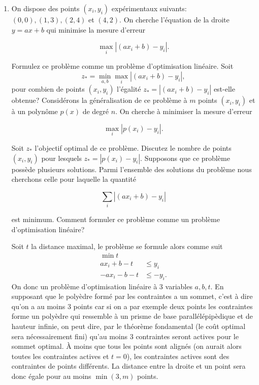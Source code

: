 \begin{enumerate}
  \item On dispose des points $(x_i, y_i)$ expérimentaux suivants: $(0, 0), (1, 3), (2, 4)$ et $(4, 2)$. On cherche l'équation de la
    droite $y=ax+b$ qui minimise la mesure d'erreur

    $$\max_i | (ax_i+b)-y_i |.$$

    Formulez ce problème comme un problème d'optimisation linéaire. Soit
    $$z_* = \min_{a, b} \max_i|(ax_i+b)-y_i|,$$ pour combien de points
    $(x_i, y_i)$ l'égalité
    $z_*= | (ax_i+b)-y_i |$ est-elle obtenue? Considérons la généralisation de ce problème à $m$ points $(x_i, y_i)$ et à un polynôme $p(x)$ de degré $n$. On
    cherche à minimiser la mesure d'erreur

    $$\max_i | p(x_i)-y_i |.$$

    Soit $z_*$ l'objectif optimal de ce problème. Discutez le nombre de points $(x_i, y_i)$ pour lesquels $z_*= | p(x_i)-y_i|$. Supposons que ce problème
    possède plusieurs solutions. Parmi l'ensemble des solutions du problème nous cherchons celle pour laquelle la quantité

    $$\sum_i | (ax_i+b)-y_i |$$

    est minimum. Comment formuler ce problème comme un problème d'optimisation linéaire?




    \begin{solution}
      Soit $t$ la distance maximal, le problème se formule alors comme suit
      \begin{align*}
        \min t\\
        ax_i + b - t & \leq y_i\\
        -ax_i - b - t & \leq -y_i.
      \end{align*}
      On donc un problème d'optimisation linéaire à 3 variables $a,b,t$.
      En supposant que le polyèdre formé par les contraintes a un sommet,
      c'est à dire qu'on a au moins 3 points car si on a par exemple
      deux points les contraintes forme un polyèdre qui ressemble à
      un prisme de base parallélépipèdique et de hauteur infinie,
      on peut dire, par le théorème fondamental
      (le coût optimal sera nécessairement fini)
      qu'au moins 3 contraintes seront actives pour le sommet optimal.
      À moins que tous les points sont alignés (on aurait alors toutes
      les contraintes actives et $t=0$),
      les contraintes actives sont des contraintes de points différents.
      La distance entre la droite et un point
      sera donc égale pour au moins $\min(3,m)$ points.


\end{solution}
\end{enumerate}
